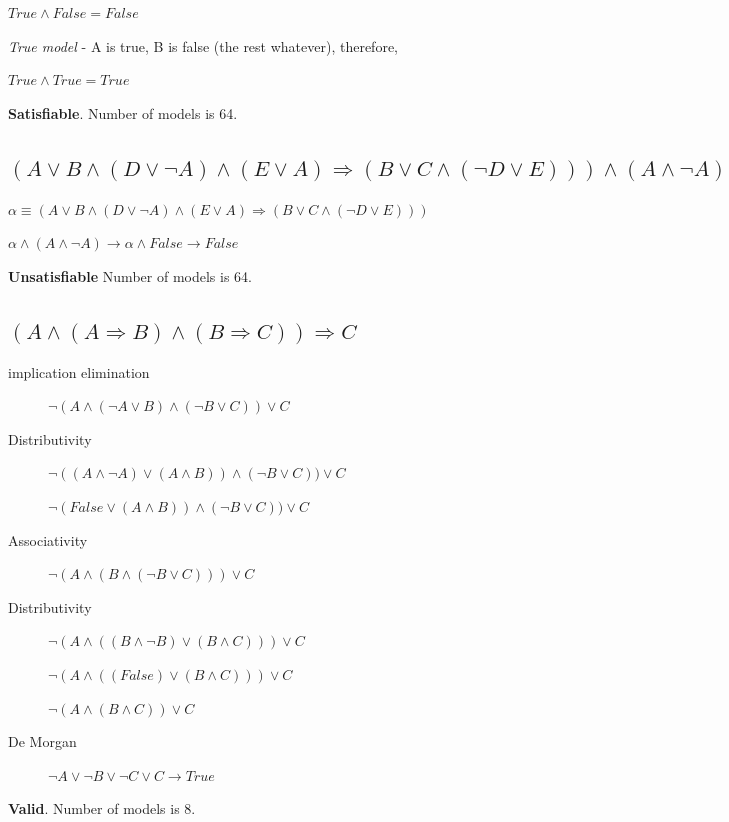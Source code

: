 \documentclass{article}                     %
\newcommand{\nt}[1]{\neg #1}
\begin{document}
	$ True \land False = False$
	
	\textit{True model} - A is true, B is false (the rest whatever), therefore,
	
	$ True \land True = True $
	
	\textbf{Satisfiable}. Number of models is 64.
	
	\subsection{$ (A \lor B \land (D \lor \nt{A}) \land (E \lor A) \Rightarrow  (B \lor C \land (\nt{D} \lor E))) \land (A \land \nt{A})$}
	
	$ \alpha \equiv (A \lor B \land (D \lor \nt{A}) \land (E \lor A) \Rightarrow  (B \lor C \land (\nt{D} \lor E))) $
	
	
	$ \alpha \land (A \land \nt{A}) \rightarrow \alpha \land False \rightarrow False $
	
	\textbf{Unsatisfiable}  Number of models is 64.
	
	\subsection{$ (A \land (A \Rightarrow B) \land (B \Rightarrow C)) \Rightarrow C $}

	\begin{description}
		\item [implication elimination]
		$ \neg (A \land (\nt{A} \lor B) \land (\nt{B} \lor C)) \lor C  $
		\item [Distributivity]
		$ \neg ((A \land \nt{A}) \lor (A \land B)) \land (\nt{B} \lor C)) \lor C  $
		
		$ \neg (False \lor (A \land B)) \land (\nt{B} \lor C)) \lor C  $
		\item [Associativity]
		$ \neg (A \land (B \land (\nt{B} \lor C))) \lor C  $
		\item [Distributivity]
		$ \neg (A \land ((B \land \nt{B}) \lor (B \land C))) \lor C  $
		
		$ \neg (A \land ((False) \lor (B \land C))) \lor C  $

		$ \neg (A \land (B \land C)) \lor C  $
		\item[De Morgan]
		$ \nt{A} \lor \nt{B} \lor \nt{C} \lor C \rightarrow True $
	\end{description}

		\textbf{Valid}.  Number of models is 8.
\end{document}

